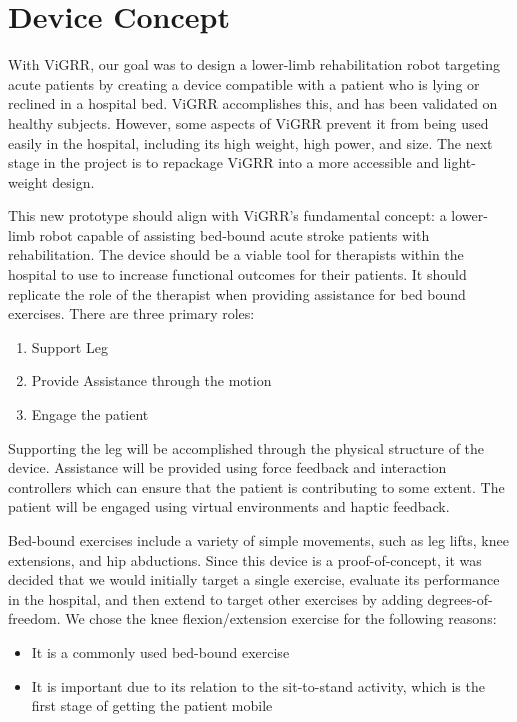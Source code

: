 \documentclass[12pt]{report}
\begin{document}
	
\section{Device Concept} 

With ViGRR, our goal was to design a lower-limb rehabilitation robot targeting acute patients by creating a device compatible with a patient who is lying or reclined in a hospital bed. ViGRR accomplishes this, and has been validated on healthy subjects. However, some aspects of ViGRR prevent it from being used easily in the hospital, including its high weight, high power, and size. The next stage in the project is to repackage ViGRR into a more accessible and light-weight design. 

This new prototype should align with ViGRR's fundamental concept: a lower-limb robot capable of assisting bed-bound acute stroke patients with rehabilitation. The device should be a viable tool for therapists within the hospital to use to increase functional outcomes for their patients. It should replicate the role of the therapist when providing assistance for bed bound exercises. There are three primary roles:

\begin{enumerate}
	\item Support Leg 
	\item Provide Assistance through the motion
	\item Engage the patient
\end{enumerate}

Supporting the leg will be accomplished through the physical structure of the device. Assistance will be provided using force feedback and interaction controllers which can ensure that the patient is contributing to some extent. The patient will be engaged using virtual environments and haptic feedback. 

Bed-bound exercises include a variety of simple movements, such as leg lifts, knee extensions, and hip abductions. Since this device is a proof-of-concept, it was decided that we would initially target a single exercise, evaluate its performance in the hospital, and then extend to target other exercises by adding degrees-of-freedom. We chose the knee flexion/extension exercise for the following reasons:

\begin{itemize}
	\item It is a commonly used bed-bound exercise
	\item It is important due to its relation to the sit-to-stand activity, which is the first stage of getting the patient mobile
\end{itemize}
 
\end{document}
